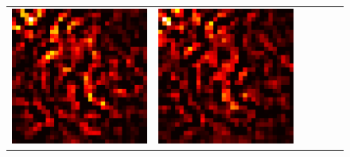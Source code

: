 \documentclass[preprint,12pt]{elsarticle}
\begin{document}
\begin{figure}[p]
\begin{tabular}{cccccc}
  \includegraphics[scale=\scale]{../visualizations/examples/cifar10/resnet18/positive_saliency_map/2.png} & 
  \includegraphics[scale=\scale]{../visualizations/examples/cifar10/resnet18/negative_saliency_map/2.png} & 

\end{tabular}
\end{figure}
\end{document}
